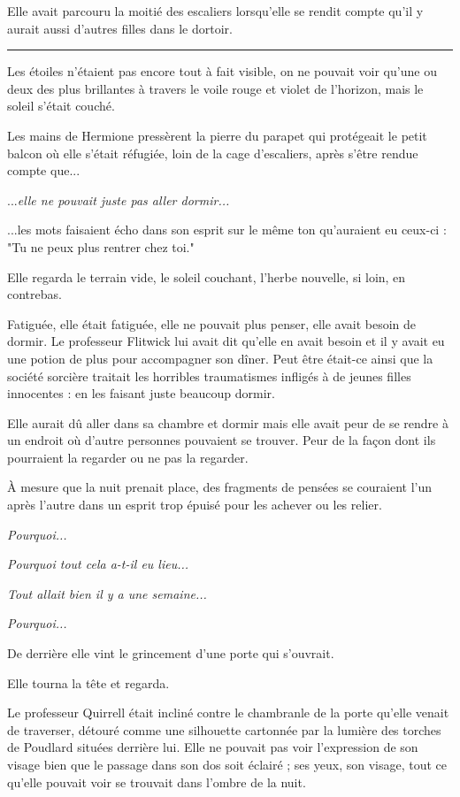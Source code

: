 Elle avait parcouru la moitié des escaliers lorsqu'elle se rendit compte qu'il y aurait aussi d'autres filles dans le dortoir.
\par\noindent\rule{\textwidth}{0.4pt}
Les étoiles n'étaient pas encore tout à fait visible, on ne pouvait voir qu'une ou deux des plus brillantes à travers le voile rouge et violet de l'horizon, mais le soleil s'était couché.

Les mains de Hermione pressèrent la pierre du parapet qui protégeait le petit balcon où elle s'était réfugiée, loin de la cage d'escaliers, après s'être rendue compte que...

...\emph{elle ne pouvait juste pas aller dormir...} 

...les mots faisaient écho dans son esprit sur le même ton qu'auraient eu ceux-ci : "Tu ne peux plus rentrer chez toi."

Elle regarda le terrain vide, le soleil couchant, l'herbe nouvelle, si loin, en contrebas.

Fatiguée, elle était fatiguée, elle ne pouvait plus penser, elle avait besoin de dormir. Le professeur Flitwick lui avait dit qu'elle en avait besoin et il y avait eu une potion de plus pour accompagner son dîner. Peut être était-ce ainsi que la société sorcière traitait les horribles traumatismes infligés à de jeunes filles innocentes : en les faisant juste beaucoup dormir.

Elle aurait dû aller dans sa chambre et dormir mais elle avait peur de se rendre à un endroit où d'autre personnes pouvaient se trouver. Peur de la façon dont ils pourraient la regarder ou ne pas la regarder.

À mesure que la nuit prenait place, des fragments de pensées se couraient l'un après l'autre dans un esprit trop épuisé pour les achever ou les relier.

\emph{Pourquoi...} 

\emph{Pourquoi tout cela a-t-il eu lieu...} 

\emph{Tout allait bien il y a une semaine...} 

\emph{Pourquoi...} 

De derrière elle vint le grincement d'une porte qui s'ouvrait.

Elle tourna la tête et regarda.

Le professeur Quirrell était incliné contre le chambranle de la porte qu'elle venait de traverser, détouré comme une silhouette cartonnée par la lumière des torches de Poudlard situées derrière lui. Elle ne pouvait pas voir l'expression de son visage bien que le passage dans son dos soit éclairé ; ses yeux, son visage, tout ce qu'elle pouvait voir se trouvait dans l'ombre de la nuit.

